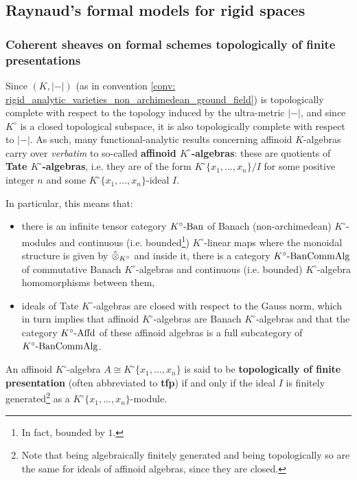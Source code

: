     \subsection{Raynaud's formal models for rigid spaces}
        \subsubsection{Coherent sheaves on formal schemes topologically of finite presentations}
            \begin{remark} \label{remark: affinoids_over_complete_valuation_rings}
                Since $(K, |-|)$ (as in convention \ref{conv: rigid_analytic_varieties_non_archimedean_ground_field}) is topologically complete with respect to the topology induced by the ultra-metric $|-|$, and since $K^{\circ}$ is a closed topological subspace, it is also topologically complete with respect to $|-|$. As such, many functional-analytic results concerning affinoid $K$-algebras carry over \textit{verbatim} to so-called \textbf{affinoid $K^{\circ}$-algebras}: these are quotients of \textbf{Tate $K^{\circ}$-algebras}, i.e. they are of the form $K^{\circ}\{x_1, ..., x_n\}/I$ for some positive integer $n$ and some $K^{\circ}\{x_1, ..., x_n\}$-ideal $I$.
                
                In particular, this means that:
                    \begin{itemize}
                        \item there is an infinite tensor category $K^{\circ}\text{-}\mathrm{Ban}$ of Banach (non-archimedean) $K^{\circ}$-modules and continuous (i.e. bounded\footnote{In fact, bounded by $1$.}) $K^{\circ}$-linear maps where the monoidal structure is given by $\hattensor_{K^{\circ}}$ and inside it, there is a category $K^{\circ}\text{-}\mathrm{Ban}\mathrm{Comm}\mathrm{Alg}$ of commutative Banach $K^{\circ}$-algebras and continuous (i.e. bounded) $K^{\circ}$-algebra homomorphisms between them,
                        \item ideals of Tate $K^{\circ}$-algebras are closed with respect to the Gauss norm, which in turn implies that affinoid $K^{\circ}$-algebras are Banach $K^{\circ}$-algebras and that the category $K^{\circ}\text{-}\mathrm{Affd}$ of these affinoid algebras is a full subcategory of $K^{\circ}\text{-}\mathrm{Ban}\mathrm{Comm}\mathrm{Alg}$.
                    \end{itemize}
            \end{remark}
            \begin{definition} \label{def: affinoid_algebras_topologically_of_finite_presentation}
                An affinoid $K^{\circ}$-algebra $A \cong K^{\circ}\{x_1, ..., x_n\}$ is said to be \textbf{topologically of finite presentation} (often abbreviated to \textbf{tfp}) if and only if the ideal $I$ is finitely generated\footnote{Note that being algebraically finitely generated and being topologically so are the same for ideals of affinoid algebras, since they are closed.} as a $K^{\circ}\{x_1, ..., x_n\}$-module. 
            \end{definition}

